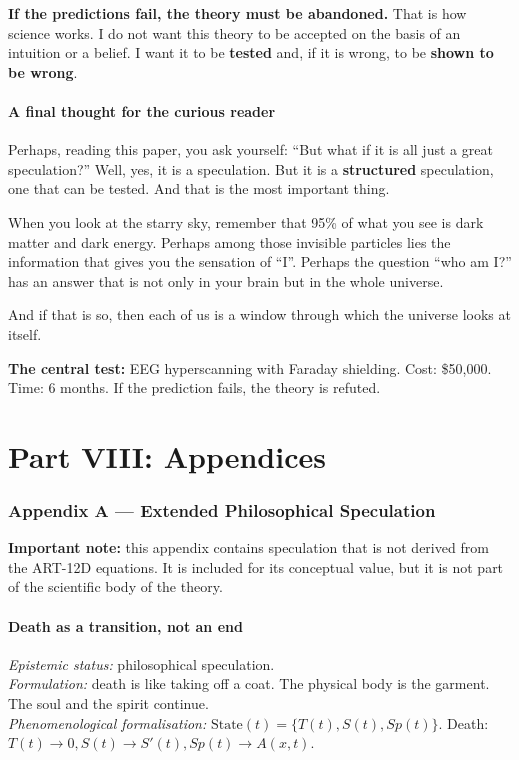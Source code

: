 \textbf{If the predictions fail, the theory must be abandoned.} That is how science works. I do not want this theory to be accepted on the basis of an intuition or a belief. I want it to be \textbf{tested} and, if it is wrong, to be \textbf{shown to be wrong}.

\subsection{A final thought for the curious reader}
Perhaps, reading this paper, you ask yourself: ``But what if it is all just a great speculation?'' Well, yes, it is a speculation. But it is a \textbf{structured} speculation, one that can be tested. And that is the most important thing.

When you look at the starry sky, remember that 95\% of what you see is dark matter and dark energy. Perhaps among those invisible particles lies the information that gives you the sensation of ``I''. Perhaps the question ``who am I?'' has an answer that is not only in your brain but in the whole universe.

And if that is so, then each of us is a window through which the universe looks at itself.

\textbf{The central test:} EEG hyperscanning with Faraday shielding. Cost: \$50,000. Time: 6 months. If the prediction fails, the theory is refuted.

\newpage
\part*{Part VIII: Appendices}

\section{Appendix A --- Extended Philosophical Speculation}
\textbf{Important note:} this appendix contains speculation that is not derived from the ART-12D equations. It is included for its conceptual value, but it is not part of the scientific body of the theory.

\subsection{Death as a transition, not an end}
\textit{Epistemic status:} philosophical speculation. \\
\textit{Formulation:} death is like taking off a coat. The physical body is the garment. The soul and the spirit continue. \\
\textit{Phenomenological formalisation:} $\text{State}(t) = \{ T(t), S(t), Sp(t) \}$. Death: $T(t) \to 0, S(t) \to S'(t), Sp(t) \to A(x,t)$.

